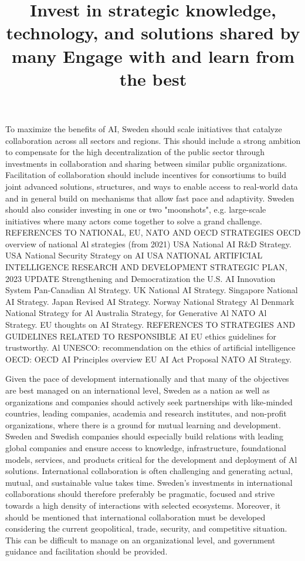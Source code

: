 \title{
Invest in strategic knowledge, technology, and solutions shared by many
}
To maximize the benefits of AI, Sweden should scale initiatives that catalyze collaboration across all sectors and regions. This should include a strong ambition to compensate for the high decentralization of the public sector through investments in collaboration and sharing between similar public organizations.
Facilitation of collaboration should include incentives for consortiums to build joint advanced solutions, structures, and ways to enable access to real-world data and in general build on mechanisms that allow fast pace and adaptivity.
Sweden should also consider investing in one or two "moonshots", e.g. large-scale initiatives where many actors come together to solve a grand challenge.
REFERENCES TO NATIONAL, EU, NATO AND OECD STRATEGIES
OECD overview of national Al strategies (from 2021)
USA National AI R\&D Strategy.
USA National Security Strategy on AI
USA NATIONAL ARTIFICIAL INTELLIGENCE RESEARCH AND DEVELOPMENT STRATEGIC PLAN, 2023 UPDATE Strengthening and Democratization the U.S. AI Innovation System
Pan-Canadian Al Strategy.
UK National AI Strategy.
Singapore National AI Strategy.
Japan Revised AI Strategy.
Norway National Strategy Al
Denmark National Strategy for Al
Australia Strategy, for Generative Al
NATO Al Strategy.
EU thoughts on AI Strategy.
REFERENCES TO STRATEGIES AND GUIDELINES RELATED TO RESPONSIBLE AI
EU ethics guidelines for trustworthy. Al
UNESCO: recommendation on the ethics of artificial intelligence
OECD: OECD AI Principles overview
EU AI Act Proposal
NATO AI Strategy.

\title{
Engage with and learn from the best
}
Given the pace of development internationally and that many of the objectives are best managed on an international level, Sweden as a nation as well as organizations and companies should actively seek partnerships with like-minded countries, leading companies, academia and research institutes, and non-profit organizations, where there is a ground for mutual learning and development.
Sweden and Swedish companies should especially build relations with leading global companies and ensure access to knowledge, infrastructure, foundational models, services, and products critical for the development and deployment of Al solutions.
International collaboration is often challenging and generating actual, mutual, and sustainable value takes time. Sweden's investments in international collaborations should therefore preferably be pragmatic, focused and strive towards a high density of interactions with selected ecosystems.
Moreover, it should be mentioned that international collaboration must be developed considering the current geopolitical, trade, security, and competitive situation. This can be difficult to manage on an organizational level, and government guidance and facilitation should be provided.
